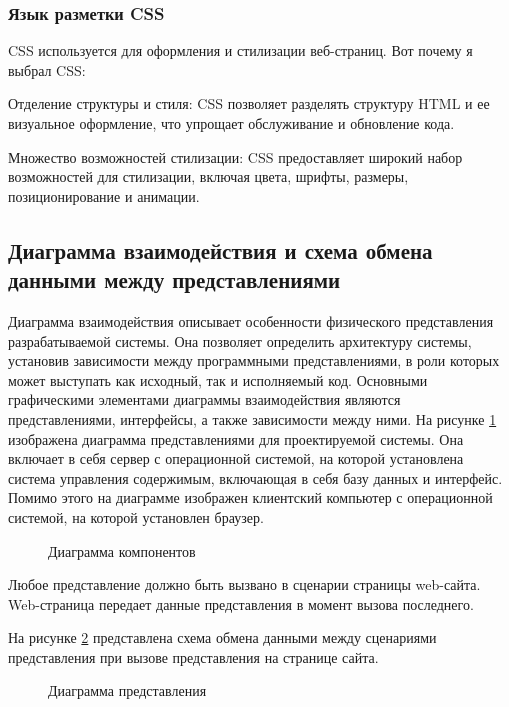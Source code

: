 \subsubsection{Язык разметки CSS}

CSS используется для оформления и стилизации веб-страниц. Вот почему я выбрал CSS:

Отделение структуры и стиля: CSS позволяет разделять структуру HTML и ее визуальное оформление, что упрощает обслуживание и обновление кода.

Множество возможностей стилизации: CSS предоставляет широкий набор возможностей для стилизации, включая цвета, шрифты, размеры, позиционирование и анимации.

\subsection{Диаграмма взаимодействия и схема обмена данными между представлениями}

Диаграмма взаимодействия описывает особенности физического представления разрабатываемой системы. Она позволяет определить архитектуру системы, установив зависимости между программными представлениями, в роли которых может выступать как исходный, так и исполняемый код. Основными графическими элементами диаграммы взаимодействия являются представлениями, интерфейсы, а также зависимости между ними. На рисунке \ref{comp:image} изображена диаграмма представлениями для проектируемой системы. Она включает в себя сервер с операционной системой, на которой установлена система управления содержимым, включающая в себя базу данных и интерфейс. Помимо этого на диаграмме изображен клиентский компьютер с операционной системой, на которой установлен браузер.

\begin{figure}[ht]
\caption{Диаграмма компонентов}
\label{comp:image}
\end{figure}

Любое представление должно быть вызвано в сценарии страницы web-сайта. Web-страница передает данные представления в момент вызова последнего.

На рисунке \ref{представления:image} представлена схема обмена данными между сценариями представления при вызове представления на странице сайта.

\begin{figure}[ht]
\caption{Диаграмма представления}
\label{представления:image}
\end{figure}

